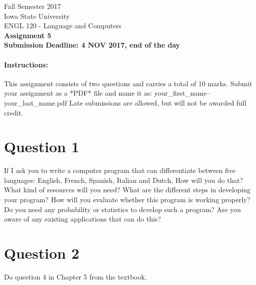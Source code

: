 \documentclass[11pt,a4paper]{article}
\begin{document}
\begin{center}
  Fall Semester 2017 \\ Iowa State University\\[3ex]
  {\large ENGL 120 - Language and Computers}\\[3ex]
  \textbf{Assignment 5} \\ \textbf{Submission Deadline: 4 NOV 2017, end of the day}
\end{center}

\paragraph{Instructions:} This assignment consists of two questions and carries a total of 10 marks. Submit your assignment as a *PDF* file and name it as: your\_first\_name--your\_last\_name.pdf Late submissions are allowed, but will not be awarded full credit. 

\section*{Question 1} 
If I ask you to write a computer program that can differentiate between five languages: English, French, Spanish, Italian and Dutch, How will you do that? What kind of resources will you need? What are the different steps in developing your program? How will you evaluate whether this program is working properly? Do you need any probability or statistics to develop such a program? Are you aware of any existing applications that can do this?

\section*{Question 2}
Do question 4 in Chapter 5 from the textbook.
\end{document}
